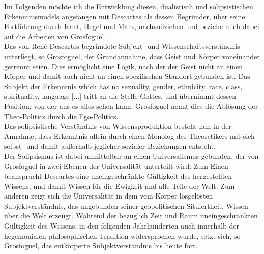 \noindent Im Folgenden möchte ich die Entwicklung diesen, dualistisch und solipsistischen
Erkenntnismodels angefangen mit Descartes als dessen Begründer, über seine
Fortführung durch Kant, Hegel und Marx, nachvollziehen und beziehe mich dabei
auf die Arbeiten von Grosfoguel.\\

Das von René Descartes begründete Subjekt-
und Wissenschaftsverständnis unterliegt, so Grosfoguel, der Grundannahme, dass
Geist und Körper voneinander getrennt seien. Dies ermöglicht eine Logik, nach
der der Geist nicht an einen Körper und damit auch nicht an einen spezifischen
Standort gebunden ist.\footnotemark {}
Das Subjekt der Erkenntnis  \glqq [...]which has no
sexuality, gender, ethnicity, race, class, spirituality, language [...]\grqq
\footnotemark {} tritt an die Stelle
Gottes, und übernimmt dessen Position, von der aus es alles sehen kann.
Grosfoguel nennt dies die Ablösung der  \glqq Theo-Politics\grqq \footnotemark
{} durch die
\glqq Ego-Politics.\grqq\footnotemark {}\\
Das solipsistische Verständnis von Wissensproduktion besteht nun in der
Annahme, dass Erkenntnis allein durch einen Monolog des Theoretikers mit sich
selbst- und damit außerhalb jeglicher sozialer Beziehungen entsteht.\footnotemark {}\\

\noindent Der Solipsismus ist dabei unmittelbar an einen Universalismus gebunden, der von
Grosfoguel in zwei Ebenen der Universalität unterteilt wird: Zum Einen
beansprucht Descartes eine uneingeschränkte Gültigkeit des hergestellten
Wissens, und damit Wissen für die Ewigkeit und alle Teile der Welt. Zum anderen
zeigt sich die Universalität in dem vom Körper losgelösten Subjektverständnis,
das ungebunden seiner geopolitischen Situiertheit, Wissen über die Welt
erzeugt. Während der bezüglich Zeit und Raum  uneingeschränkten Gültigkeit des
Wissens, in den folgenden Jahrhunderten auch innerhalb der hegemonialen
philosophischen Tradition widersprochen wurde, setzt sich, so Grosfoguel, das
entkörperte Subjektverständnis bis heute fort.\\

